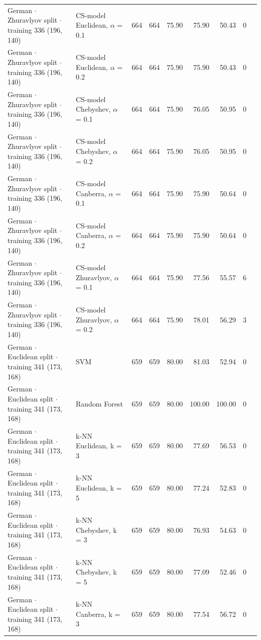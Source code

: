 \begin{longtable}{llrrrrrrl}
  German $\cdot$ Zhuravlyov split $\cdot$ training 336 (196, 140) & CS-model Euclidean, $\alpha$ = 0.1 & 664 & 664 & 75.90 & 75.90 & 50.43 & 0 &  \\
  German $\cdot$ Zhuravlyov split $\cdot$ training 336 (196, 140) & CS-model Euclidean, $\alpha$ = 0.2 & 664 & 664 & 75.90 & 75.90 & 50.43 & 0 &  \\
  German $\cdot$ Zhuravlyov split $\cdot$ training 336 (196, 140) & CS-model Chebyshev, $\alpha$ = 0.1 & 664 & 664 & 75.90 & 76.05 & 50.95 & 0 &  \\
  German $\cdot$ Zhuravlyov split $\cdot$ training 336 (196, 140) & CS-model Chebyshev, $\alpha$ = 0.2 & 664 & 664 & 75.90 & 76.05 & 50.95 & 0 &  \\
  German $\cdot$ Zhuravlyov split $\cdot$ training 336 (196, 140) & CS-model Canberra, $\alpha$ = 0.1 & 664 & 664 & 75.90 & 75.90 & 50.64 & 0 &  \\
  German $\cdot$ Zhuravlyov split $\cdot$ training 336 (196, 140) & CS-model Canberra, $\alpha$ = 0.2 & 664 & 664 & 75.90 & 75.90 & 50.64 & 0 &  \\
  German $\cdot$ Zhuravlyov split $\cdot$ training 336 (196, 140) & CS-model Zhuravlyov, $\alpha$ = 0.1 & 664 & 664 & 75.90 & 77.56 & 55.57 & 6 &  \\
  German $\cdot$ Zhuravlyov split $\cdot$ training 336 (196, 140) & CS-model Zhuravlyov, $\alpha$ = 0.2 & 664 & 664 & 75.90 & 78.01 & 56.29 & 3 &  \\
  German $\cdot$ Euclidean split $\cdot$ training 341 (173, 168) & SVM & 659 & 659 & 80.00 & 81.03 & 52.94 & 0 &  \\
  German $\cdot$ Euclidean split $\cdot$ training 341 (173, 168) & Random Forest & 659 & 659 & 80.00 & 100.00 & 100.00 & 0 &  \\
  German $\cdot$ Euclidean split $\cdot$ training 341 (173, 168) & k-NN Euclidean, k = 3 & 659 & 659 & 80.00 & 77.69 & 56.53 & 0 &  \\
  German $\cdot$ Euclidean split $\cdot$ training 341 (173, 168) & k-NN Euclidean, k = 5 & 659 & 659 & 80.00 & 77.24 & 52.83 & 0 &  \\
  German $\cdot$ Euclidean split $\cdot$ training 341 (173, 168) & k-NN Chebyshev, k = 3 & 659 & 659 & 80.00 & 76.93 & 54.63 & 0 &  \\
  German $\cdot$ Euclidean split $\cdot$ training 341 (173, 168) & k-NN Chebyshev, k = 5 & 659 & 659 & 80.00 & 77.09 & 52.46 & 0 &  \\
  German $\cdot$ Euclidean split $\cdot$ training 341 (173, 168) & k-NN Canberra, k = 3 & 659 & 659 & 80.00 & 77.54 & 56.72 & 0 &  \\

\end{longtable}
